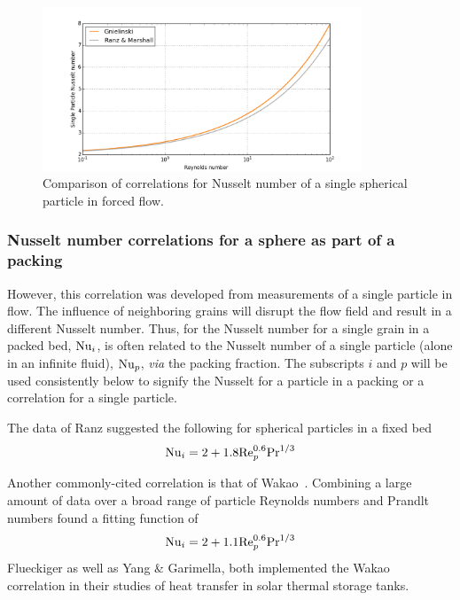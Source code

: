 \begin{figure}[ht]
    \centering
    \includegraphics[width=0.85\textwidth]{figures/Nusselt-single}
    \caption{Comparison of correlations for Nusselt number of a single spherical particle in forced flow.}
    \label{fig:Nu-single}
\end{figure}





\subsubsection{Nusselt number correlations for a sphere as part of a packing}
However, this correlation was developed from measurements of a single particle in flow. The influence of neighboring grains will disrupt the flow field and result in a different Nusselt number. Thus, for the Nusselt number for a single grain in a packed bed, $\mathrm{Nu}_i$, is often related to the Nusselt number of a single particle (alone in an infinite fluid), $\mathrm{Nu}_p$, \textit{via} the packing fraction. The subscripts $i$ and $p$ will be used consistently below to signify the Nusselt for a particle in a packing or a correlation for a single particle. 

The data of Ranz suggested the following for spherical particles in a fixed bed
\begin{equation}\label{eq:ranz-packing}
    \mathrm{Nu}_i = 2 + 1.8\mathrm{Re}_p^{0.6} \mathrm{Pr}^{1/3}
\end{equation}

Another commonly-cited correlation is that of Wakao\etal~\cite{Wakao1978,wakao1982heat}. Combining a large amount of data over a broad range of particle Reynolds numbers and Prandlt numbers found a fitting function of
\begin{equation}\label{eq:wakao}
    \mathrm{Nu}_i = 2 + 1.1\mathrm{Re}_p^{0.6} \mathrm{Pr}^{1/3}
\end{equation}
Flueckiger\etal \cite{Flueckiger2014,Flueckiger2011a,Flueckiger2011} as well as Yang \& Garimella\cite{Yang2010}, both implemented the Wakao\etal~ correlation in their studies of heat transfer in solar thermal storage tanks. 

